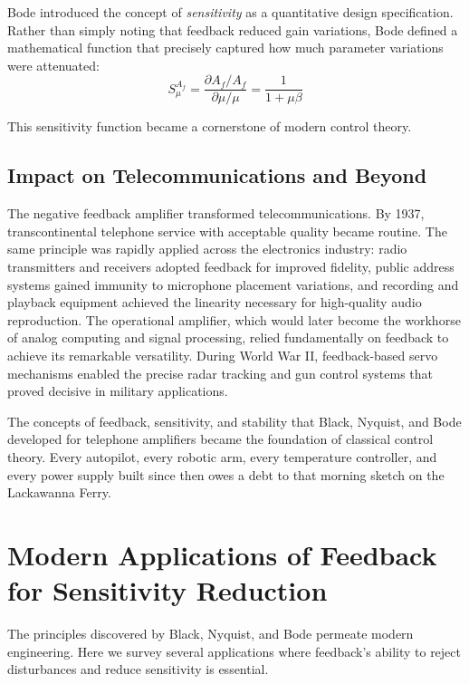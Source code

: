 Bode introduced the concept of \textit{sensitivity} as a quantitative design specification. Rather than simply noting that feedback reduced gain variations, Bode defined a mathematical function that precisely captured how much parameter variations were attenuated:
\begin{equation}
S^{A_f}_{\mu} = \frac{\partial A_f / A_f}{\partial \mu / \mu} = \frac{1}{1 + \mu\beta}
\end{equation}

This sensitivity function became a cornerstone of modern control theory.

\subsection{Impact on Telecommunications and Beyond}

The negative feedback amplifier transformed telecommunications. By 1937, transcontinental telephone service with acceptable quality became routine. The same principle was rapidly applied across the electronics industry: radio transmitters and receivers adopted feedback for improved fidelity, public address systems gained immunity to microphone placement variations, and recording and playback equipment achieved the linearity necessary for high-quality audio reproduction. The operational amplifier, which would later become the workhorse of analog computing and signal processing, relied fundamentally on feedback to achieve its remarkable versatility. During World War II, feedback-based servo mechanisms enabled the precise radar tracking and gun control systems that proved decisive in military applications.

The concepts of feedback, sensitivity, and stability that Black, Nyquist, and Bode developed for telephone amplifiers became the foundation of classical control theory. Every autopilot, every robotic arm, every temperature controller, and every power supply built since then owes a debt to that morning sketch on the Lackawanna Ferry.

\section{Modern Applications of Feedback for Sensitivity Reduction}
\label{sec:modern_applications}

The principles discovered by Black, Nyquist, and Bode permeate modern engineering. Here we survey several applications where feedback's ability to reject disturbances and reduce sensitivity is essential.

